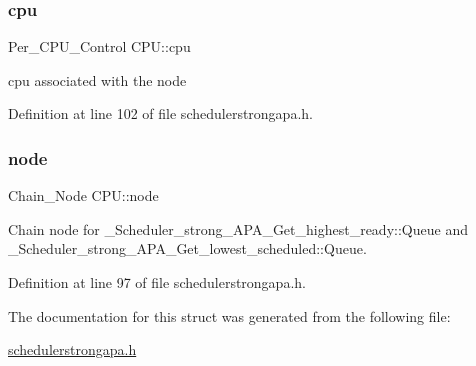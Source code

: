 \subsubsection{\texorpdfstring{cpu}{cpu}}
{\footnotesize\ttfamily Per\+\_\+\+C\+P\+U\+\_\+\+Control C\+P\+U\+::cpu}



cpu associated with the node 



Definition at line 102 of file schedulerstrongapa.\+h.

\mbox{\label{structCPU_a52476a7d08b3ede8a92c40857d33dc8a}} 
\subsubsection{\texorpdfstring{node}{node}}
{\footnotesize\ttfamily Chain\+\_\+\+Node C\+P\+U\+::node}



Chain node for \+\_\+\+Scheduler\+\_\+strong\+\_\+\+A\+P\+A\+\_\+\+Get\+\_\+highest\+\_\+ready\+::\+Queue and \+\_\+\+Scheduler\+\_\+strong\+\_\+\+A\+P\+A\+\_\+\+Get\+\_\+lowest\+\_\+scheduled\+::\+Queue. 



Definition at line 97 of file schedulerstrongapa.\+h.



The documentation for this struct was generated from the following file\+:\begin{DoxyCompactItemize}
\item 
\hyperlink{schedulerstrongapa_8h}{schedulerstrongapa.\+h}\end{DoxyCompactItemize}
